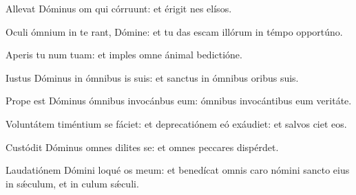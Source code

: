\item {}

\item \psnonrepetitur{}Allevat Dóminus om qui córruunt:\psstar{} et érigit nes elísos.

\item Oculi ómnium in te rant, Dómine:\psstar{} et tu das escam illórum in témpo opportúno.

\item Aperis tu num tuam:\psstar{} et imples omne ánimal bedictióne.

\item Iustus Dóminus in ómnibus is suis:\psstar{} et sanctus in ómnibus oribus suis.

\item Prope est Dóminus ómnibus invocánbus eum:\psstar{} ómnibus invocántibus eum  veritáte.

\item Voluntátem timéntium se fáciet:\pscross{} et deprecatiónem eó exáudiet:\psstar{} et salvos ciet eos.

\item Custódit Dóminus omnes dilites se:\psstar{} et omnes peccares dispérdet.

\item Laudatiónem Dómini loqué os meum:\psstar{} et benedícat omnis caro nómini sancto eius in sǽculum, et in culum sǽculi.

